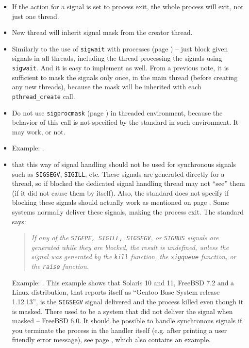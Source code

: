\begin{itemize}
\item If the action for a signal is set to process exit, the whole process
will exit, not just one thread.
\item New thread will inherit signal mask from the creator thread.
\item Similarly to the use of \texttt{sigwait} with processes (page
\pageref{SIGWAIT}) -- just block given signals in all threads, including the
thread processing the signals using \texttt{sigwait}.
  And it is easy to implement as well.  From a previous note, it is
sufficient to mask the signals only once, in the main thread (before creating
any new threads), because the mask will be inherited with each
\texttt{pthread\_create} call.
\item Do not use \texttt{sigprocmask} (page \pageref{SIGPROCMASK}) in threaded
environment, because the behavior of this call is not specified by the standard
in such environment. It may work, or not.
\item {} Example: .
\item {} that this way of signal handling should not be used for
synchronous signals such as \texttt{SIGSEGV}, \texttt{SIGILL}, etc. These
signals are generated directly for a thread, so if blocked the dedicated signal
handling thread may not ``see'' them (if it did not cause them by itself).
Also, the standard does not specify if blocking these signals should actually
work as mentioned on page \pageref{SPECIALSIGNALS}. Some systems
normally deliver these signals, making the process exit. The standard says:

\begin{quote}
\emph{If any of the \texttt{SIGFPE, SIGILL, SIGSEGV}, or \texttt{SIGBUS} signals
are generated while they are blocked, the result is undefined, unless the signal
was generated by the \texttt{kill} function, the \texttt{sigqueue} function, or
the \texttt{raise} function.}
\end{quote}

Example: . This example shows that
Solaris 10 and 11, FreeBSD 7.2 and a Linux distribution, that reports
itself as ``Gentoo Base System release 1.12.13'', is the \texttt{SIGSEGV} signal
delivered and the process killed even though it is masked.
There used to be a system that did not deliver the signal when masked
-- FreeBSD 6.0.  It should be possible to handle synchronous signals
if you terminate the process in the handler itself (e.g. after printing a user
friendly error message), see page \pageref{SPECIALSIGNALS}, which also contains
an example.

\end{itemize}


